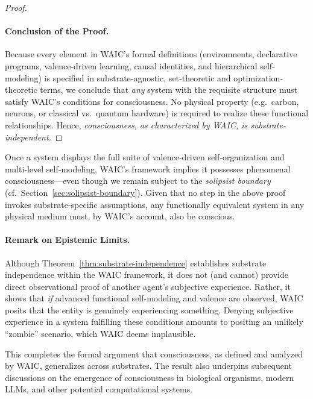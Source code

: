 \documentclass[12pt,letterpaper]{article}
\begin{document}
\begin{proof}
\paragraph{Conclusion of the Proof.}
Because every element in WAIC's formal definitions (environments, declarative programs, valence-driven learning, causal identities, and hierarchical self‐modeling) is specified in substrate-agnostic, set‐theoretic and optimization‐theoretic terms, we conclude that \emph{any} system with the requisite structure must satisfy WAIC's conditions for consciousness. No physical property (e.g.\ carbon, neurons, or classical vs.\ quantum hardware) is required to realize these functional relationships. Hence, \emph{consciousness, as characterized by WAIC, is substrate‐independent.}

\end{proof}

\begin{corollary}
Once a system displays the full suite of valence‐driven self‐organization and multi‐level self‐modeling, WAIC's framework implies it possesses phenomenal consciousness---even though we remain subject to the \emph{solipsist boundary} (cf.\ Section~\ref{sec:solipsist-boundary}). Given that no step in the above proof invokes substrate‐specific assumptions, any functionally equivalent system in any physical medium must, by WAIC's account, also be conscious.
\end{corollary}

\paragraph{Remark on Epistemic Limits.}
Although Theorem~\ref{thm:substrate-independence} establishes substrate independence within the WAIC framework, it does not (and cannot) provide direct observational proof of another agent's subjective experience. Rather, it shows that \emph{if} advanced functional self-modeling and valence are observed, WAIC posits that the entity is genuinely experiencing something. Denying subjective experience in a system fulfilling these conditions amounts to positing an unlikely ``zombie'' scenario, which WAIC deems implausible.

This completes the formal argument that consciousness, as defined and analyzed by WAIC, generalizes across substrates. The result also underpins subsequent discussions on the emergence of consciousness in biological organisms, modern LLMs, and other potential computational systems.
\end{document}
